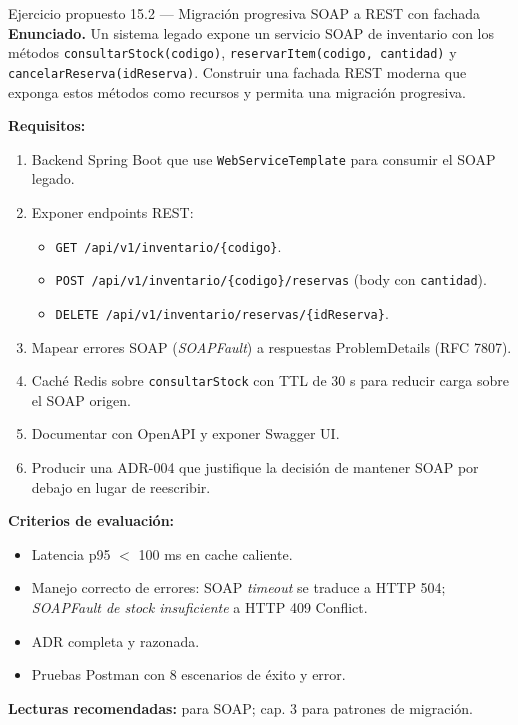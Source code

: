 \begin{cajaejercicio}{Ejercicio propuesto 15.2 --- Migración progresiva SOAP a REST con fachada}
\textbf{Enunciado.} Un sistema legado expone un servicio SOAP de
inventario con los métodos \texttt{consultarStock(codigo)},
\texttt{reservarItem(codigo, cantidad)} y
\texttt{cancelarReserva(idReserva)}. Construir una fachada REST
moderna que exponga estos métodos como recursos y permita una
migración progresiva.

\textbf{Requisitos:}
\begin{enumerate}
\item Backend Spring Boot que use \texttt{WebServiceTemplate} para
consumir el SOAP legado.
\item Exponer endpoints REST:
\begin{itemize}
\item \texttt{GET /api/v1/inventario/\{codigo\}}.
\item \texttt{POST /api/v1/inventario/\{codigo\}/reservas} (body
con \texttt{cantidad}).
\item \texttt{DELETE /api/v1/inventario/reservas/\{idReserva\}}.
\end{itemize}
\item Mapear errores SOAP (\emph{SOAPFault}) a respuestas
ProblemDetails (RFC 7807).
\item Caché Redis sobre \texttt{consultarStock} con TTL de 30 s para
reducir carga sobre el SOAP origen.
\item Documentar con OpenAPI y exponer Swagger UI.
\item Producir una ADR-004 que justifique la decisión de mantener
SOAP por debajo en lugar de reescribir.
\end{enumerate}

\textbf{Criterios de evaluación:}
\begin{itemize}
\item Latencia p95 $<$ 100 ms en cache caliente.
\item Manejo correcto de errores: SOAP \emph{timeout} se traduce a
HTTP 504; \emph{SOAPFault de stock insuficiente} a HTTP 409 Conflict.
\item ADR completa y razonada.
\item Pruebas Postman con 8 escenarios de éxito y error.
\end{itemize}

\textbf{Lecturas recomendadas:} \cite{alonso2010webservice} para
SOAP; \cite{newman2021building} cap. 3 para patrones de migración.
\end{cajaejercicio}

